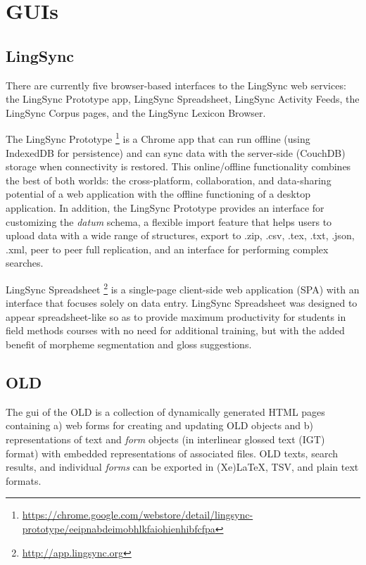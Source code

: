 \documentclass[11pt]{article}
\begin{document}
\section{GUIs}


\subsection{LingSync}

There are currently five browser-based interfaces to the LingSync web services:
the LingSync Prototype app, LingSync Spreadsheet, LingSync Activity Feeds, the
LingSync Corpus pages, and the LingSync Lexicon Browser.

The LingSync Prototype%
\footnote{\url{https://chrome.google.com/webstore/detail/lingsync-prototype/eeipnabdeimobhlkfaiohienhibfcfpa}} %
is a Chrome app that can run offline (using IndexedDB for persistence) and can
sync data with the server-side (CouchDB) storage when connectivity is restored.
This online/offline functionality combines the best of both worlds: the
cross-platform, collaboration, and data-sharing potential of a web application
with the offline functioning of a desktop application. In addition, the
LingSync Prototype provides an interface for customizing the \emph{datum}
schema, a flexible import feature that helps users to upload data with a wide
range of structures, export to .zip, .csv, .tex, .txt, .json, .xml, peer to
peer full replication, and an interface for performing complex searches.

LingSync Spreadsheet%
\footnote{\url{http://app.lingsync.org}} %
is a single-page client-side web application (SPA) with an interface that
focuses solely on data entry. LingSync Spreadsheet was designed to appear
spreadsheet-like so as to provide maximum productivity for students in field
methods courses with no need for additional training, but with the added
benefit of morpheme segmentation and gloss suggestions.



\subsection{OLD}

The \gls{gui} of the OLD %
is a collection of dynamically generated HTML pages containing a) web forms for
creating and updating OLD objects and b) representations of text and
\emph{form} objects (in interlinear glossed text (IGT) format) with embedded
representations of associated files. OLD texts, search results, and individual
\emph{forms} can be exported in (Xe)LaTeX, TSV, and plain text formats.
\end{document}
